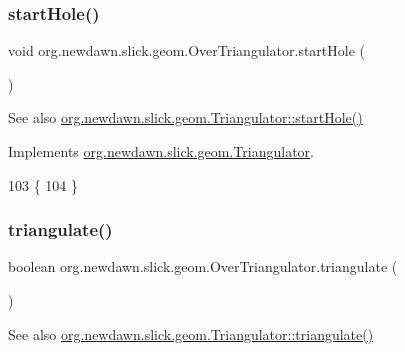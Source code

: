 \subsubsection{\texorpdfstring{start\+Hole()}{startHole()}}
{\footnotesize\ttfamily void org.\+newdawn.\+slick.\+geom.\+Over\+Triangulator.\+start\+Hole (\begin{DoxyParamCaption}{ }\end{DoxyParamCaption})\hspace{0.3cm}{\ttfamily [inline]}}

\begin{DoxySeeAlso}{See also}
\mbox{\hyperlink{interfaceorg_1_1newdawn_1_1slick_1_1geom_1_1_triangulator_a0636d620daef98eab2ceb5bcf9dfaa9d}{org.\+newdawn.\+slick.\+geom.\+Triangulator\+::start\+Hole()}} 
\end{DoxySeeAlso}


Implements \mbox{\hyperlink{interfaceorg_1_1newdawn_1_1slick_1_1geom_1_1_triangulator_a0636d620daef98eab2ceb5bcf9dfaa9d}{org.\+newdawn.\+slick.\+geom.\+Triangulator}}.


\begin{DoxyCode}
103                             \{
104     \}
\end{DoxyCode}
\mbox{\label{classorg_1_1newdawn_1_1slick_1_1geom_1_1_over_triangulator_aabce5b7a47ea28da8332d0d3c546269b}} 
\subsubsection{\texorpdfstring{triangulate()}{triangulate()}}
{\footnotesize\ttfamily boolean org.\+newdawn.\+slick.\+geom.\+Over\+Triangulator.\+triangulate (\begin{DoxyParamCaption}{ }\end{DoxyParamCaption})\hspace{0.3cm}{\ttfamily [inline]}}

\begin{DoxySeeAlso}{See also}
\mbox{\hyperlink{interfaceorg_1_1newdawn_1_1slick_1_1geom_1_1_triangulator_a7c7ce8f59679b6c759a1e3d15ec4ee92}{org.\+newdawn.\+slick.\+geom.\+Triangulator\+::triangulate()}} 
\end{DoxySeeAlso}


